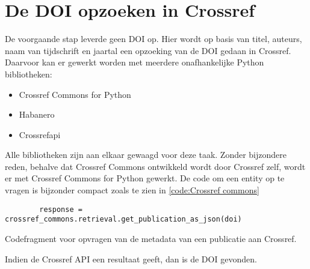 \section{De DOI opzoeken in Crossref}
De voorgaande stap leverde geen DOI op.
Hier wordt op basis van titel, auteurs, naam van tijdschrift en jaartal een opzoeking van de DOI gedaan in Crossref. 
Daarvoor kan er gewerkt worden met meerdere onafhankelijke Python bibliotheken:
\begin{itemize}
    \item Crossref Commons for Python \autocite{Crossrefcommons2025}
    \item Habanero \autocite{Habanero2025}
    \item Crossrefapi \autocite{Crossrefapi2025}
\end{itemize}
Alle bibliotheken zijn aan elkaar gewaagd voor deze taak. Zonder bijzondere reden, behalve dat Crossref Commons ontwikkeld wordt door Crossref zelf, wordt er met Crossref Commons for Python gewerkt. De code om een entity op te vragen is bijzonder compact zoals te zien in \ref{code:Crossref commons}
\begin{listing}
    \begin{verbatim}
        response = crossref_commons.retrieval.get_publication_as_json(doi)
    \end{verbatim}
    \caption[Crossref commons codefragment]{Codefragment voor opvragen van de metadata van een publicatie aan Crossref.}
    \label{code:Crossref commons}
\end{listing}
Indien de Crossref API een resultaat geeft, dan is de DOI gevonden.
